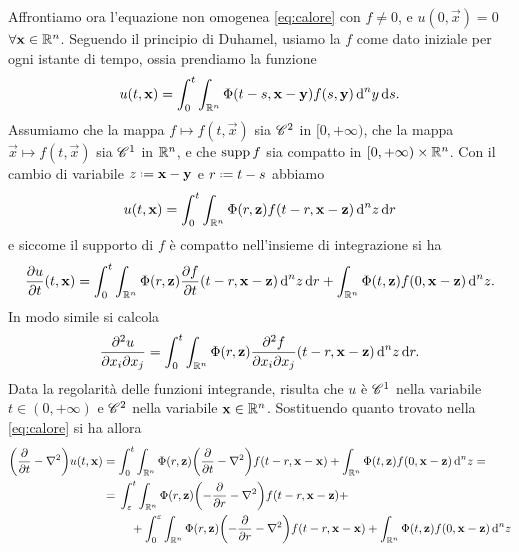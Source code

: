 Affrontiamo ora l'equazione non omogenea \eqref{eq:calore} con $f\ne 0$, e $u(0,\vec x)=0$ $\forall\vec x\in\R^n$.
Seguendo il principio di Duhamel, usiamo la $f$ come dato iniziale per ogni istante di tempo, ossia prendiamo la funzione
\begin{equation}
    u(t,\vec x)=\int_0^t\int_{\R^n}\sfc(t-s,\vec x-\vec y)f(s,\vec y)\,\dd^ny\,\dd s.
\end{equation}
Assumiamo che la mappa $f\mapsto f(t,\vec x)$ sia $\cclass[2]$ in $[0,+\infty)$, che la mappa $\vec x\mapsto f(t,\vec x)$ sia $\cclass[1]$ in $\R^n$, e che $\supp f$ sia compatto in $[0,+\infty)\times\R^n$.
Con il cambio di variabile $z\defeq\vec x-\vec y$ e $r\defeq t-s$ abbiamo
\begin{equation}
    u(t,\vec x)=
    \int_0^t\int_{\R^n}\sfc(r,\vec z)f(t-r,\vec x-\vec z)\,\dd^nz\,\dd r
\end{equation}
e siccome il supporto di $f$ è compatto nell'insieme di integrazione si ha
\begin{equation}
    \drp{u}{t}(t,\vec x)=\int_0^t\int_{\R^n}\sfc(r,\vec z)\drp{f}{t}(t-r,\vec x-\vec z)\,\dd^nz\,\dd r+\int_{\R^n}\sfc(t,\vec z)f(0,\vec x-\vec z)\,\dd^nz.
\end{equation}
In modo simile si calcola
\begin{equation}
    \frac{\partial^2 u}{\partial x_i\partial x_j}=
    \int_0^t\int_{\R^n}\sfc(r,\vec z)\frac{\partial^2 f}{\partial x_i\partial x_j}(t-r,\vec x-\vec z)\,\dd^nz\,\dd r.
\end{equation}
Data la regolarità delle funzioni integrande, risulta che $u$ è $\cclass[1]$ nella variabile $t\in(0,+\infty)$ e $\cclass[2]$ nella variabile $\vec x\in\R^n$.
Sostituendo quanto trovato nella \eqref{eq:calore} si ha allora
\begin{equation}
    \begin{split}
        \biggl(\drp{}{t}-\lap\biggr)u(t,\vec x)&=
        \int_0^t\int_{\R^n}\sfc(r,\vec z)\biggl(\drp{}{t}-\lap\biggr)f(t-r,\vec x-\vec x)+\int_{\R^n}\sfc(t,\vec z)f(0,\vec x-\vec z)\,\dd^nz=\\ &=
        \!\begin{multlined}[t]
            \int_\epsilon^t\int_{\R^n}\sfc(r,\vec z)\biggl(-\drp{}{r}-\lap\biggr)f(t-r,\vec x-\vec z)+\\+
            \int_0^\epsilon\int_{\R^n}\sfc(r,\vec z)\biggl(-\drp{}{r}-\lap\biggr)f(t-r,\vec x-\vec x)+\int_{\R^n}\sfc(t,\vec z)f(0,\vec x-\vec z)\,\dd^nz
        \end{multlined}
    \end{split}
\end{equation}
